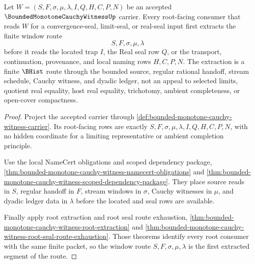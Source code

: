 \begin{theorem}\label{thm:bounded-monotone-cauchy-witness-root-window-extraction}
Let $W=(S,F,\sigma,\mu,\lambda,I,Q,H,C,P,N)$ be an accepted $\BoundedMonotoneCauchyWitnessUp$ carrier. Every root-facing consumer that reads $W$ for a convergence-seal, limit-seal, or real-seal input first extracts the finite window route
$$
S,F,\sigma,\mu,\lambda
$$
before it reads the located trap $I$, the Real seal row $Q$, or the transport, continuation, provenance, and local naming rows $H,C,P,N$. The extraction is a finite $\BHist$ route through the bounded source, regular rational handoff, stream schedule, Cauchy witness, and dyadic ledger, not an appeal to selected limits, quotient real equality, host real equality, trichotomy, ambient completeness, or open-cover compactness.
\end{theorem}
\begin{proof}
Project the accepted carrier through \autoref{def:bounded-monotone-cauchy-witness-carrier}. Its root-facing rows are exactly $S,F,\sigma,\mu,\lambda,I,Q,H,C,P,N$, with no hidden coordinate for a limiting representative or ambient completion principle.

Use the local NameCert obligations and scoped dependency package, \autoref{thm:bounded-monotone-cauchy-witness-namecert-obligations} and \autoref{thm:bounded-monotone-cauchy-witness-scoped-dependency-package}. They place source reads in $S$, regular handoff in $F$, stream windows in $\sigma$, Cauchy witnesses in $\mu$, and dyadic ledger data in $\lambda$ before the located and seal rows are available.

Finally apply root extraction and root seal route exhaustion, \autoref{thm:bounded-monotone-cauchy-witness-root-extraction} and \autoref{thm:bounded-monotone-cauchy-witness-root-seal-route-exhaustion}. Those theorems identify every root consumer with the same finite packet, so the window route $S,F,\sigma,\mu,\lambda$ is the first extracted segment of the route.
\end{proof}

